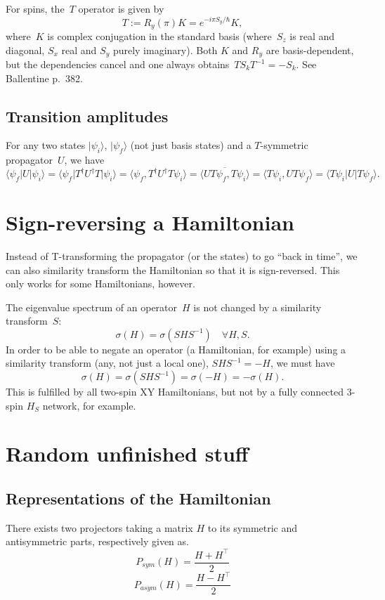 \documentclass[aps,pra,12pt,nofootinbib,superscriptaddress,longbibliography,showpacs]{revtex4-1}
\theoremstyle{plain}
\theoremstyle{definition}
\newcommand{\bra}[1]{\mbox{$\langle #1|$}}
\newcommand{\ket}[1]{\ensuremath{|#1\rangle}}
\newcommand{\iprod}[2]{\ensuremath{\langle #1,#2 \rangle}}
\newcommand{\be}{\begin{equation}}
\newcommand{\ee}{\end{equation}}
\begin{document}
For spins, the~$T$ operator is given by
\be
T := R_y(\pi) K = e^{-i \pi S_y/\hbar} K,
\ee
where~$K$ is complex conjugation in the standard basis (where~$S_z$ is
real and diagonal, $S_x$ real and $S_y$ purely imaginary).
Both $K$ and $R_y$ are basis-dependent, but the dependencies cancel and
one always obtains~$T S_k T^{-1} = -S_k$.
See Ballentine p.~382.




\subsection{Transition amplitudes}
For any two states $\ket{\psi_i}$, $\ket{\psi_f}$ (not just basis
states) and a $T$-symmetric propagator~$U$, we have
\be
\bra{\psi_f} U \ket{\psi_i}
= \bra{\psi_f} T^\dagger U^\dagger T \ket{\psi_i}
= \iprod{\psi_f}{T^\dagger U^\dagger T \psi_i}
= \overline{\iprod{U T \psi_f}{T \psi_i}}
= \iprod{T \psi_i}{U T \psi_f}
= \bra{T \psi_i} U \ket{T \psi_f}.
\ee




\section{Sign-reversing a Hamiltonian}

Instead of T-transforming the propagator (or the states) to go ``back
in time'', we can also similarity transform the Hamiltonian so
that it is sign-reversed. This only works for some Hamiltonians, however.

The eigenvalue spectrum of an operator~$H$ is not changed by a similarity transform~$S$:
\be
\sigma(H) = \sigma(S H S^{-1}) \quad \forall H, S.
\ee
In order to be able to negate an operator (a Hamiltonian, for example)
using a similarity transform (any, not just a local one), $S H S^{-1} = -H$, we must have
\be
\sigma(H) = \sigma(S H S^{-1}) = \sigma(-H) = -\sigma(H).
\ee
This is fulfilled by all two-spin XY Hamiltonians, but not by a
fully connected 3-spin $H_S$ network, for example.


\section{Random unfinished stuff}

\subsection{Representations of the Hamiltonian} 
There exists two projectors taking a matrix $H$ to its symmetric and antisymmetric parts, respectively given as.  
$$
P_{sym}(H) = \frac{H+H^\top}{2}
$$ 
$$
P_{asym}(H) = \frac{H-H^\top}{2}
$$ 
\end{document}
